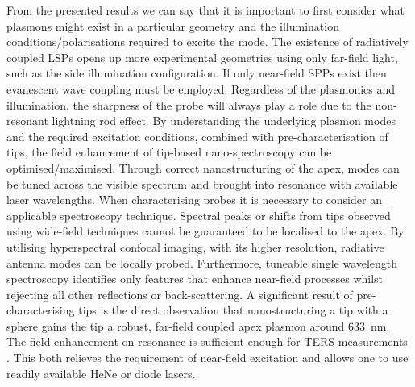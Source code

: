\documentclass{article}
\begin{document}

From the presented results we can say that it is important to first consider what plasmons might exist in a particular geometry and the illumination conditions/polarisations required to excite the mode. The existence of radiatively coupled LSPs opens up more experimental geometries using only far-field light, such as the side illumination configuration. If only near-field SPPs exist then evanescent wave coupling must be employed.
Regardless of the plasmonics and illumination, the sharpness of the probe will always play a role due to the non-resonant lightning rod effect. By understanding the underlying plasmon modes and the required excitation conditions, combined with pre-characterisation of tips, the field enhancement of tip-based nano-spectroscopy can be {\color{red}optimised/maximised}. Through correct nanostructuring of the apex, modes can be tuned across the visible spectrum and brought into resonance with available laser wavelengths.
When characterising probes it is necessary to consider an applicable spectroscopy technique. Spectral peaks {\color{red}or shifts} from tips observed using wide-field techniques cannot be guaranteed to be localised to the apex. By utilising hyperspectral confocal imaging, with its higher resolution, radiative antenna modes can be locally probed. Furthermore, tuneable single wavelength spectroscopy identifies only features that enhance near-field processes whilst rejecting all other reflections or back-scattering.
A significant result of pre-characterising tips is the direct observation that nanostructuring a tip with a sphere gains the tip a robust, far-field coupled apex plasmon around \SI{633}{nm}. {\color{red}The field enhancement on resonance is sufficient enough for TERS measurements \cite{umakoshi2012, sanders2014}}.
This both relieves the requirement of near-field excitation and allows one to use readily available HeNe or diode lasers.
\end{document}
